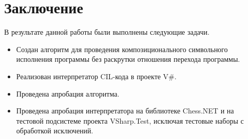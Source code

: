 \section{Заключение}
В результате данной работы были выполнены следующие задачи.
\begin{itemize}
    \item Создан алгоритм для проведения композиционального символьного исполнения программы без раскрутки отношения перехода программы.
    \item Реализован интерпретатор CIL-кода в проекте V\#.
    \item Проведена апробация алгоритма.
    \item Проведена апробация интерпретатора на библиотеке Chess.NET и на тестовой подсистеме проекта VSharp.Test, исключая тестовые наборы с обработкой исключений.
\end{itemize}